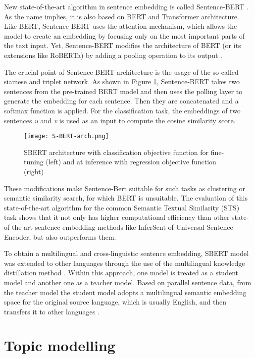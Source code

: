 \documentclass[fontsize=12pt,a4paper,twoside,openany]{scrbook}
\begin{document}
New state-of-the-art algorithm in sentence embedding is called Sentence-BERT \parencite{Reimers19}. As the name implies, it is also based on BERT and Transformer architecture. Like BERT, Sentence-BERT uses the attention mechanism, which allows the model to create an embedding by focusing only on the most important parts of the text input. Yet, Sentence-BERT modifies the architecture of BERT (or its extensions like RoBERTa) by adding a pooling operation to its output \parencite{Reimers19}.

The crucial point of Sentence-BERT architecture is the usage of the so-called siamese and triplet network. As shown in Figure \ref{fig:S-BERT-arch}, Sentence-BERT takes two sentences from the pre-trained BERT model and then uses the polling layer to generate the embedding for each sentence. Then they are concatenated and a softmax function is applied. For the classification task, the embeddings of two sentences \emph{u} and \emph{v} is used as an input to compute the cosine similarity score.


\begin{figure}[h]
\centering
\texttt{[image: S-BERT-arch.png]}
\caption{SBERT architecture with classification objective function for fine-tuning (left) and at inference with regression objective function (right) \parencite[from][]{Reimers19}}
\label{fig:S-BERT-arch}
\end{figure}

These modifications make Sentence-Bert suitable for such tasks as clustering or semantic similarity search, for which BERT is unsuitable. The evaluation of this state-of-the-art algorithm for the common Semantic Textual Similarity (STS) task shows that it not only has higher computational efficiency than other state-of-the-art sentence embedding methods like InferSent of Universal Sentence Encoder, but also outperforms them.

To obtain a multilingual and cross-linguistic sentence embedding, SBERT model was extended to other languages through the use of the multilingual knowledge distillation method \parencite{Reimers20}. Within this approach, one model is treated as a student model and another one as a teacher model. Based on parallel sentence data, from the teacher model the student model adopts a multilingual semantic embedding space for the original source language, which is usually English, and then transfers it to other languages \parencite{Reimers20}. 

\section{Topic modelling}
\label{sec:B}
\end{document}

